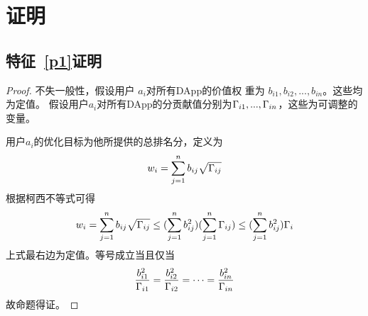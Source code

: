 \section{证明}
\subsection{特征~\ref{p1}证明}
\label{subsection:proof1}
\begin{proof}

不失一般性，假设用户 $a_i$对所有DApp的价值权
重为 $b_{i1}, b_{i2}, ..., b_{in}$。这些均为定值。
假设用户$a_i$对所有DApp的分贡献值分别为$\Gamma_{i1},...,\Gamma_{in}$，这些为可调整的变量。

用户$a_i$的优化目标为他所提供的总排名分，定义为
$$w_i = \sum_{j=1}^n b_{ij}\sqrt{\Gamma_{ij}}$$
根据柯西不等式可得
$$w_i = \sum_{j=1}^n b_{ij}\sqrt{\Gamma_{ij}} \leq (\sum_{j=1}^n b_{ij}^2)(\sum_{j=1}^n \Gamma_{ij}) \leq (\sum_{j=1}^n b_{ij}^2)\Gamma_i$$
上式最右边为定值。等号成立当且仅当
$$\frac{b_{i1}^2}{\Gamma_{i1}}=\frac{b_{i2}^2}{\Gamma_{i2}}=\cdots=\frac{b_{in}^2}{\Gamma_{in}}$$
故命题得证。

\end{proof}
